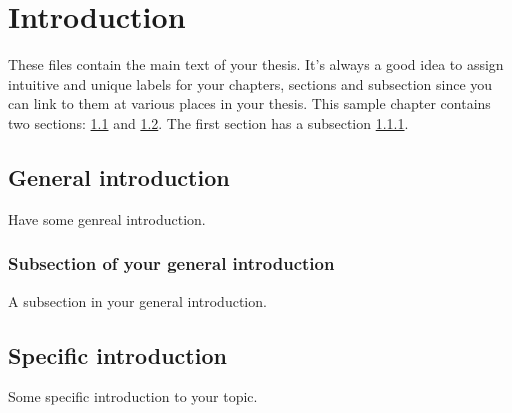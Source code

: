 
\chapter{Introduction}
\label{chap_intro}

These files contain the main text of your thesis. It's always a good idea to assign intuitive and unique labels for your chapters, sections and subsection since you can link to them at various places in your thesis. This sample chapter contains two sections: \ref{gen_intro} and \ref{specific_intro}. The first section has a subsection \ref{subsec_for_gen_intro}.

\section{General introduction}
\label{gen_intro}

Have some genreal introduction.

\subsection{Subsection of your general introduction}
\label{subsec_for_gen_intro}

A subsection in your general introduction.

\section{Specific introduction}
\label{specific_intro}

Some specific introduction to your topic.
